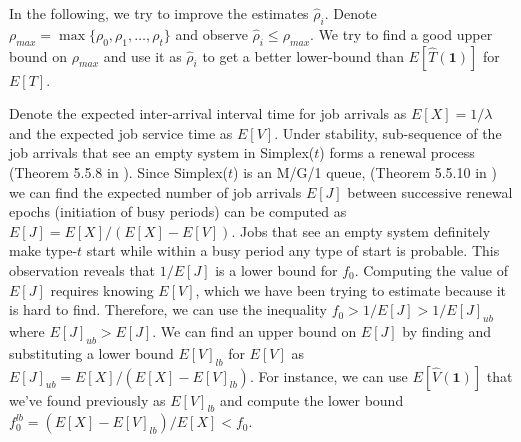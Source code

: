 \documentclass[sigconf,draft]{acmart}
\begin{document}
In the following, we try to improve the estimates $\hat{\rho}_i$. Denote $\rho_{max} = \max\{\rho_0, \rho_1, \ldots, \rho_t\}$ and observe $\hat{\rho}_i \leq \rho_{max}$. We try to find a good upper bound on $\rho_{max}$ and use it as $\hat{\rho}_i$ to get a better lower-bound than $E[\hat{T}(\bm{1})]$ for $E[T]$.

Denote the expected inter-arrival interval time for job arrivals as $E[X] = 1/\lambda$ and the expected job service time as $E[V]$. Under stability, sub-sequence of the job arrivals that see an empty system in Simplex($t$) forms a renewal process (Theorem 5.5.8 in \cite{gallager2013stochastic}). Since Simplex($t$) is an M/G/1 queue, (Theorem 5.5.10 in \cite{gallager2013stochastic}) we can find the expected number of job arrivals $E[J]$ between successive renewal epochs (initiation of busy periods) can be computed as $E[J] = E[X]/(E[X]-E[V])$. Jobs that see an empty system definitely make type-$t$ start while within a busy period any type of start is probable. This observation reveals that $1/E[J]$ is a lower bound for $f_0$. Computing the value of $E[J]$ requires knowing $E[V]$, which we have been trying to estimate because it is hard to find. Therefore, we can use the inequality $f_0 > 1/E[J] > 1/E[J]_{ub}$ where $E[J]_{ub} > E[J]$. We can find an upper bound on $E[J]$ by finding and substituting a lower bound $E[V]_{lb}$ for $E[V]$ as $E[J]_{ub} = E[X]/(E[X]-E[V]_{lb})$. For instance, we can use $E[\hat{V}(\bm{1})]$ that we've found previously as $E[V]_{lb}$ and compute the lower bound $f_0^{lb} = (E[X]-E[V]_{lb})/E[X] < f_0$. 
\end{document}
